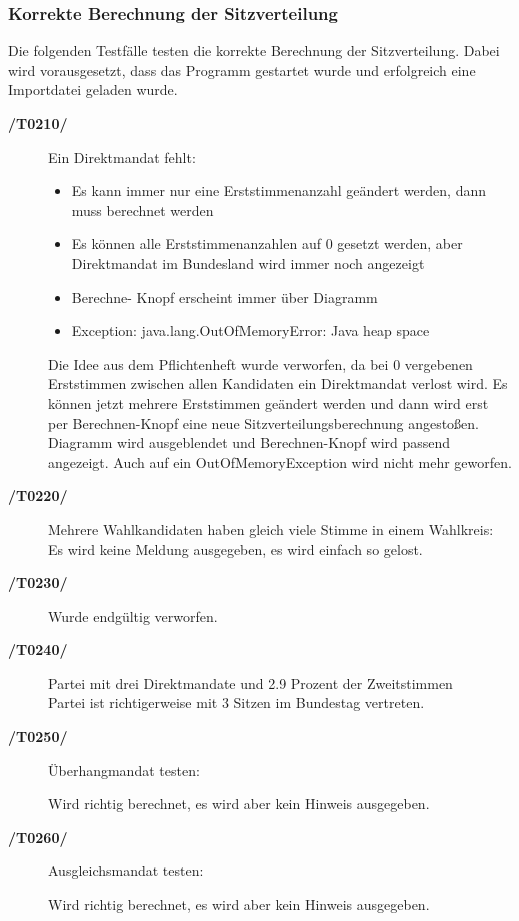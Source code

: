 \documentclass[12pt,a4paper,titlepage]{article}
\begin{document}
\subsubsection{Korrekte Berechnung der Sitzverteilung}
Die folgenden Testfälle testen die korrekte Berechnung der Sitzverteilung. Dabei wird vorausgesetzt, dass  das Programm gestartet wurde und erfolgreich eine Importdatei geladen wurde.
\begin{description}
	\item[\textbf{/T0210/}] Ein Direktmandat fehlt: \\
	\begin{itemize}
	\item Es kann immer nur eine Erststimmenanzahl geändert werden, dann muss berechnet werden
	\item Es können alle Erststimmenanzahlen auf 0 gesetzt werden, aber Direktmandat im Bundesland wird immer noch angezeigt
	\item Berechne- Knopf erscheint immer über Diagramm
	\item Exception: java.lang.OutOfMemoryError: Java heap space
	\end{itemize}
	
	Die Idee aus dem Pflichtenheft wurde verworfen, da bei 0 vergebenen Erststimmen zwischen allen Kandidaten ein Direktmandat verlost wird.
	Es können jetzt mehrere Erststimmen geändert werden und dann wird erst per Berechnen-Knopf eine neue Sitzverteilungsberechnung angestoßen.
	Diagramm wird ausgeblendet und Berechnen-Knopf wird passend angezeigt.
	Auch auf ein OutOfMemoryException wird nicht mehr geworfen.
	\item[\textbf{/T0220/}] Mehrere Wahlkandidaten haben gleich viele Stimme in einem Wahlkreis: \\
	Es wird keine Meldung ausgegeben, es wird einfach so gelost.
	\item[\textbf{/T0230/}] Wurde endgültig verworfen.
	\item[\textbf{/T0240/}] Partei mit drei Direktmandate und 2.9 Prozent der Zweitstimmen \\
	Partei ist richtigerweise mit 3 Sitzen im Bundestag vertreten.
	
	\item[\textbf{/T0250/}] Überhangmandat testen: \\
\begin{itemize}
Wird richtig berechnet, es wird aber kein Hinweis ausgegeben.
\end{itemize}
	\item[\textbf{/T0260/}] Ausgleichsmandat testen: \\
\begin{itemize}
Wird richtig berechnet, es wird aber kein Hinweis ausgegeben.
	
\end{itemize}

\end{description}
\end{document}

